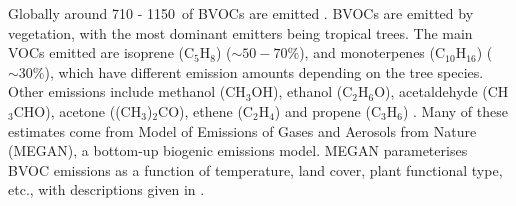     Globally around 710 - 1150\tgcpyr ~of BVOCs are emitted \parencite{Guenther1995, Lathiere2006, Guenther2012, Messina2016}.
    BVOCs are emitted by vegetation, with the most dominant emitters being 
    tropical trees. 
    The main VOCs emitted are isoprene (C$_5$H$_8$) ($\sim50-70\%$), and 
    monoterpenes (C$_10$H$_16$) ($\sim30\%$), which have different emission 
    amounts depending on the tree 
    species\parencite{Guenther2012, Sindelarova2014}. 
    Other emissions include methanol (CH$_3$OH), ethanol (C$_2$H$_6$O), 
    acetaldehyde (CH$_3$CHO), acetone ((CH$_3$)$_2$CO), ethene (C$_2$H$_4$) and 
    propene (C$_3$H$_6$) \parencite{Guenther2012}.
    Many of these estimates come from Model of Emissions of Gases and Aerosols 
    from Nature (MEGAN), a bottom-up biogenic emissions model.
    MEGAN parameterises BVOC emissions as a function of temperature, land 
    cover, plant functional type, etc., with descriptions given in 
    \textcite{Guenther2012}.

    
    
    
    
